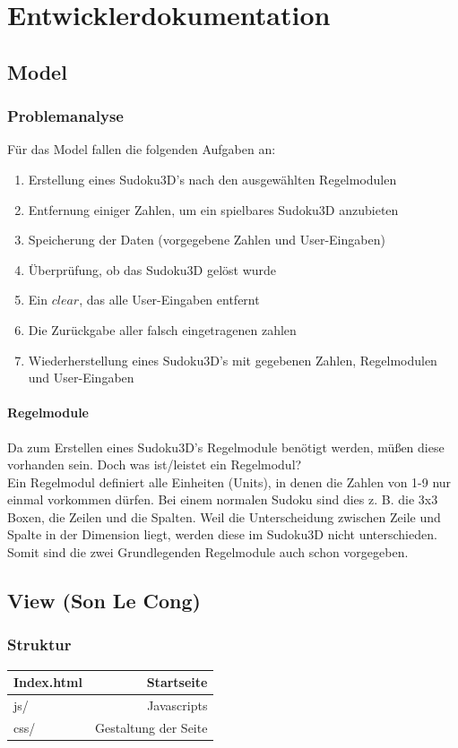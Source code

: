 \documentclass[a4paper,12pt]{scrreprt}
\begin{document}
	\chapter{Entwicklerdokumentation}
	\section{Model}
	\subsection{Problemanalyse}
	F\"ur das Model fallen die folgenden Aufgaben an:
	\begin{enumerate}
		\item Erstellung eines Sudoku3D's nach den ausgew\"ahlten Regelmodulen
		\item Entfernung einiger Zahlen, um ein spielbares Sudoku3D anzubieten
		\item Speicherung der Daten (vorgegebene Zahlen und User-Eingaben)
		\item \"Uberpr\"ufung, ob das Sudoku3D gel\"ost wurde
		\item Ein $clear$, das alle User-Eingaben entfernt
		\item Die Zur\"uckgabe aller falsch eingetragenen zahlen
		\item Wiederherstellung eines Sudoku3D's mit gegebenen Zahlen, Regelmodulen und
			User-Eingaben
	\end{enumerate}

	\subsubsection{Regelmodule}
	Da zum Erstellen eines Sudoku3D's Regelmodule ben\"otigt werden, m\"u{\ss}en diese vorhanden
	sein. Doch was ist/leistet ein Regelmodul?\medskip \\
	Ein Regelmodul definiert alle Einheiten (Units), in denen die Zahlen von 1-9 nur einmal vorkommen
	d\"urfen. Bei einem normalen Sudoku sind dies z. B. die 3x3 Boxen, die Zeilen und die Spalten.
	Weil die Unterscheidung zwischen Zeile und Spalte in der Dimension liegt, werden diese im
	Sudoku3D nicht unterschieden. Somit sind die zwei Grundlegenden Regelmodule auch schon
	vorgegeben.

	\section{View (Son Le Cong)}
	\subsection{Struktur}
	\begin{tabular}{l | r}
		\hline
		Index.html & Startseite \\
		\hline
		js/ & Javascripts \\
		\hline
		css/ & Gestaltung der Seite \\
		\hline
	\end{tabular}
\end{document}
